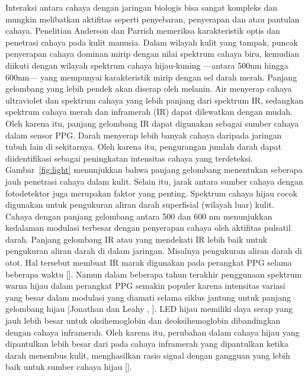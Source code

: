 Interaksi antara cahaya dengan jaringan biologis bisa sangat kompleks dan mungkin melibatkan aktifitas seperti penyebaran, penyerapan dan atau pantulan cahaya. Penelitian Anderson dan Parrish \citep{ANDERSON1981} memeriksa karakteristik optis dan penetrasi cahaya pada kulit manusia. Dalam wilayah kulit yang tampak, puncak penyerapan cahaya dominan mirip dengan nilai spektrum cahaya biru, kemudian diikuti dengan wilayah spektrum cahaya hijau-kuning ---antara 500nm hingga 600nm--- yang mempunyai karakteristik mirip dengan sel darah merah. Panjang gelombang yang lebih pendek akan diserap oleh melanin. Air menyerap cahaya ultraviolet dan spektrum cahaya yang lebih panjang dari spektrum IR, sedangkan spektrum cahaya merah dan inframerah (IR) dapat dilewatkan dengan mudah. Oleh karena itu, panjang gelombang IR dapat digunakan sebagai sumber cahaya dalam sensor PPG.
Darah menyerap lebih banyak cahaya daripada jaringan tubuh lain di sekitarnya. Oleh karena itu, pengurangan jumlah darah dapat diidentifikasi sebagai peningkatan intensitas cahaya yang terdeteksi. Gambar~\ref{fig:light} menunjukkan bahwa panjang gelombang menentukan seberapa jauh penetrasi cahaya dalam kulit. Selain itu, jarak antara sumber cahaya dengan fotodetektor juga merupakan faktor yang penting. Spektrum cahaya hijau cocok digunakan untuk pengukuran aliran darah superfisial (wilayah luar) kulit. Cahaya dengan panjang gelombang antara 500 dan 600 nm menunjukkan kedalaman modulasi terbesar dengan penyerapan cahaya oleh aktifitas pulsatil darah. Panjang gelombang IR atau yang mendekati IR lebih baik untuk pengukuran aliran darah di dalam jaringan. Misalnya pengukuran aliran darah di otot. Hal tersebut membuat IR marak digunakan pada perangkat PPG selama beberapa waktu [\citet{Tamura2014}]. Namun dalam beberapa tahun terakhir penggunaan spektrum warna hijau dalam perangkat PPG semakin populer karena intensitas variasi yang besar dalam modulasi yang diamati selama siklus jantung untuk panjang gelombang hijau [Jonathan dan Leahy \citep{Enock}, \citet{Lee2013,Maeda2011,Maeda2008,Matsu2014,Scully2012}].
LED hijau memiliki daya serap yang jauh lebih besar untuk oksihemoglobin dan deoksihemoglobin dibandingkan dengan cahaya inframerah. Oleh karena itu, perubahan dalam cahaya hijau yang dipantulkan lebih besar dari pada cahaya inframerah yang dipantulkan ketika darah menembus kulit, menghasilkan rasio signal dengan gangguan yang lebih baik untuk sumber cahaya hijau [\citet{Tamura2014}].


